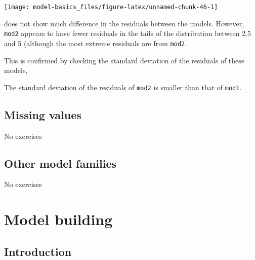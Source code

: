 \documentclass[]{book}
\newenvironment{Shaded}{\begin{snugshade}}{\end{snugshade}}
\newcommand{\CommentTok}[1]{\textcolor[rgb]{0.56,0.35,0.01}{\textit{#1}}}
\newcommand{\DataTypeTok}[1]{\textcolor[rgb]{0.13,0.29,0.53}{#1}}
\newcommand{\KeywordTok}[1]{\textcolor[rgb]{0.13,0.29,0.53}{\textbf{#1}}}
\newcommand{\NormalTok}[1]{#1}
\newcommand{\OperatorTok}[1]{\textcolor[rgb]{0.81,0.36,0.00}{\textbf{#1}}}
\newcommand{\StringTok}[1]{\textcolor[rgb]{0.31,0.60,0.02}{#1}}
\theoremstyle{plain}
\theoremstyle{remark}
\begin{document}
\begin{center}\texttt{[image: model-basics\_files/figure-latex/unnamed-chunk-46-1]} \end{center}

does not show much difference in the residuals between the models.
However, \texttt{mod2} appears to have fewer residuals in the tails of
the distribution between 2.5 and 5 (although the most extreme residuals
are from \texttt{mod2}.

This is confirmed by checking the standard deviation of the residuals of
these models,

\begin{Shaded}
\end{Shaded}

The standard deviation of the residuals of \texttt{mod2} is smaller than
that of \texttt{mod1}.

\hypertarget{missing-values-2}{%
\section{Missing values}\label{missing-values-2}}

No exercises

\hypertarget{other-model-families}{%
\section{Other model families}\label{other-model-families}}

No exercises

\hypertarget{model-building}{%
\chapter{Model building}\label{model-building}}

\hypertarget{introduction-15}{%
\section{Introduction}\label{introduction-15}}
\end{document}

